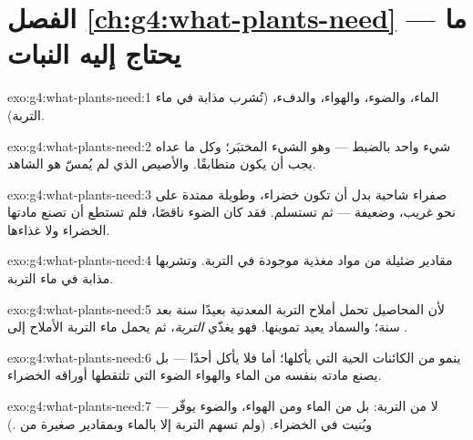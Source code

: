 \section*{الفصل \ref{ch:g4:what-plants-need} --- ما يحتاج إليه النبات}

\begin{solution}{exo:g4:what-plants-need:1}
الماء، والضوء، والهواء، والدفء،  (تُشرب مذابة في
ماء التربة).
\end{solution}

\begin{solution}{exo:g4:what-plants-need:2}
شيء واحد بالضبط --- وهو الشيء المختبَر؛ وكل ما عداه يجب أن يكون
متطابقًا. والأصيص الذي لم يُمسّ هو الشاهد.
\end{solution}

\begin{solution}{exo:g4:what-plants-need:3}
صفراء شاحبة بدل أن تكون خضراء، وطويلة ممتدة على نحو غريب، وضعيفة
--- ثم تستسلم. فقد كان الضوء ناقصًا، فلم تستطع  أن تصنع
مادتها الخضراء ولا غذاءها.
\end{solution}

\begin{solution}{exo:g4:what-plants-need:4}
مقادير ضئيلة من مواد مغذية موجودة في التربة. وتشربها  مذابة
في ماء التربة.
\end{solution}

\begin{solution}{exo:g4:what-plants-need:5}
لأن المحاصيل تحمل أملاح التربة المعدنية بعيدًا سنة بعد سنة؛ والسماد
يعيد تموينها. فهو يغذّي \emph{التربة}، ثم يحمل ماء التربة الأملاح
إلى .
\end{solution}

\begin{solution}{exo:g4:what-plants-need:6}
 ينمو من الكائنات الحية التي يأكلها؛ أما  فلا يأكل
أحدًا --- بل يصنع مادته بنفسه من الماء  والهواء
 الضوء التي تلتقطها أوراقه الخضراء.
\end{solution}

\begin{solution}{exo:g4:what-plants-need:7}
لا من التربة: بل من الماء ومن الهواء، والضوء يوفّر  ---
وبُنيت في  الخضراء. (ولم تسهم التربة إلا بالماء وبمقادير
صغيرة من .)
\end{solution}

